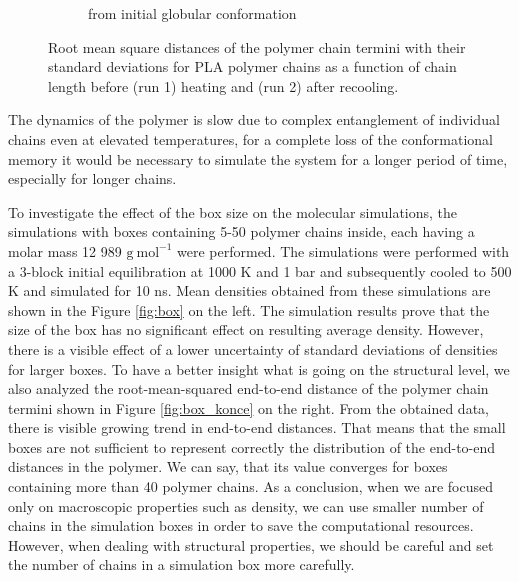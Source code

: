 \begin{figure}[htb!]
\begin{subfigure}{0.5\textwidth}
		\caption{from initial globular conformation}
		\vspace{-0.2cm}
		\label{fig:subim2}
	\end{subfigure}
	\caption{Root mean square distances of the polymer chain termini with their standard deviations  for PLA polymer chains as a function of chain length before (run 1) heating and (run 2) after recooling.}
	\label{fig:pla_konce}
\end{figure}      

The dynamics of the polymer is slow due to complex entanglement of individual chains even at elevated temperatures, for a complete loss of the conformational memory it would be necessary to simulate the system for a longer period of time, especially for longer chains.

To investigate the effect of the box size on the molecular simulations, the simulations with boxes containing 5-50 polymer chains inside, each having a molar mass 12 989 $\mathrm{g \ mol^{-1}}$ were performed. The simulations were performed with a 3-block initial equilibration at 1000 K and 1 bar and subsequently cooled to 500 K and simulated for 10 ns. Mean densities obtained from these simulations are shown in the Figure \ref{fig:box} on the left. The simulation results prove that the size of the box has no significant effect on resulting average density. However, there is a visible effect of a lower uncertainty of standard deviations of densities for larger boxes. To have a better insight what is going on the structural level, we also analyzed the root-mean-squared end-to-end distance of the polymer chain termini shown in Figure \ref{fig:box_konce} on the right. From the obtained data, there is visible growing trend in end-to-end distances. That means that the small boxes are not sufficient to represent correctly the distribution of the end-to-end distances in the polymer. We can say, that its value converges for boxes containing more than 40 polymer chains. As a conclusion, when we are focused only on macroscopic properties such as density, we can use smaller number of chains in the simulation boxes in order to save the computational resources. However, when dealing with structural properties, we should be careful and set the number of chains in a simulation box more carefully.

